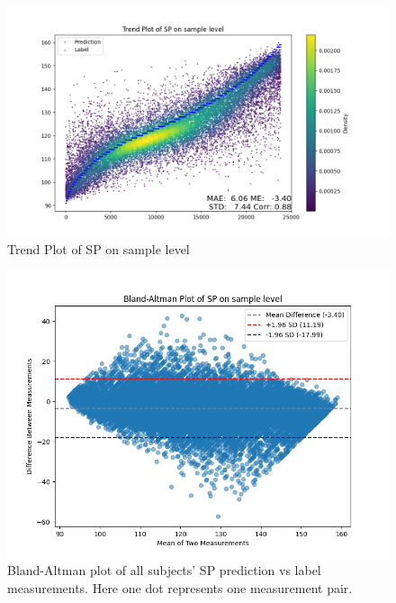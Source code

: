 \documentclass{article}
\begin{document}
\begin{figure}[H]
\centering
\includegraphics[width=\textwidth]{./Fig/Trend_Plot_SP_on_sample_level.png}
\caption{Trend Plot of SP on sample level}
\label{fig:image1}
\end{figure}

\begin{figure}[H]
\centering
\includegraphics[width=\textwidth]{./Fig/Bland_Altman_Plot_SP_on_sample_level.png}
\caption{Bland-Altman plot of all subjects' SP prediction vs label measurements. Here one dot represents one measurement pair.}
\label{fig:image1}
\end{figure}
\end{document}
